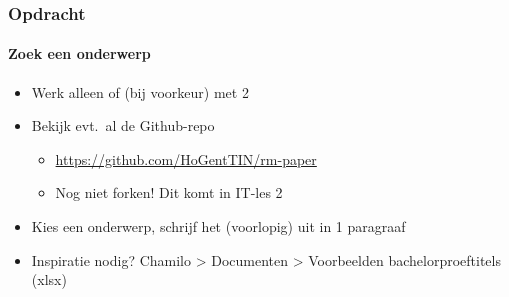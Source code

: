 \documentclass[aspectratio=169]{beamer}
\begin{document}
\begin{frame}
  \frametitle{Opdracht}
  \framesubtitle{Zoek een onderwerp}

  \begin{itemize}
    \item Werk alleen of (bij voorkeur) met 2
    \item Bekijk evt.\ al de Github-repo
      \begin{itemize}
        \item \url{https://github.com/HoGentTIN/rm-paper}
        \item Nog niet forken! Dit komt in IT-les 2
      \end{itemize}
    \item Kies een onderwerp, schrijf het (voorlopig) uit in 1 paragraaf
    \item Inspiratie nodig? Chamilo > Documenten > Voorbeelden bachelorproeftitels (xlsx)
  \end{itemize}

\end{frame}
\end{document}
